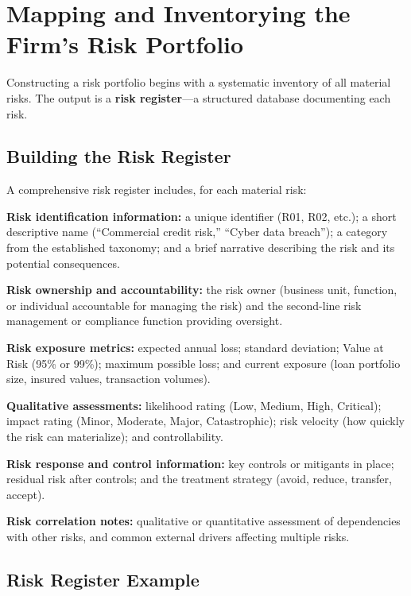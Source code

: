 \documentclass[11pt,openany]{book}
\begin{document}
\section{Mapping and Inventorying the Firm's Risk Portfolio}
\label{sec:risk-register}

Constructing a risk portfolio begins with a systematic inventory of all
material risks. The output is a \textbf{risk register}---a structured database
documenting each risk.

\subsection{Building the Risk Register}
\label{subsec:building-register}

A comprehensive risk register includes, for each material risk:

\textbf{Risk identification information:} a unique identifier (R01, R02,
etc.); a short descriptive name (``Commercial credit risk,'' ``Cyber data
breach''); a category from the established taxonomy; and a brief narrative
describing the risk and its potential consequences.

\textbf{Risk ownership and accountability:} the risk owner (business unit,
function, or individual accountable for managing the risk) and the
second-line risk management or compliance function providing oversight.

\textbf{Risk exposure metrics:} expected annual loss; standard deviation;
Value at Risk (95\% or 99\%); maximum possible loss; and current exposure
(loan portfolio size, insured values, transaction volumes).

\textbf{Qualitative assessments:} likelihood rating (Low, Medium, High,
Critical); impact rating (Minor, Moderate, Major, Catastrophic); risk velocity
(how quickly the risk can materialize); and controllability.

\textbf{Risk response and control information:} key controls or mitigants in
place; residual risk after controls; and the treatment strategy (avoid,
reduce, transfer, accept).

\textbf{Risk correlation notes:} qualitative or quantitative assessment of
dependencies with other risks, and common external drivers affecting multiple
risks.

\subsection{Risk Register Example}
\label{subsec:register-example}
\end{document}
